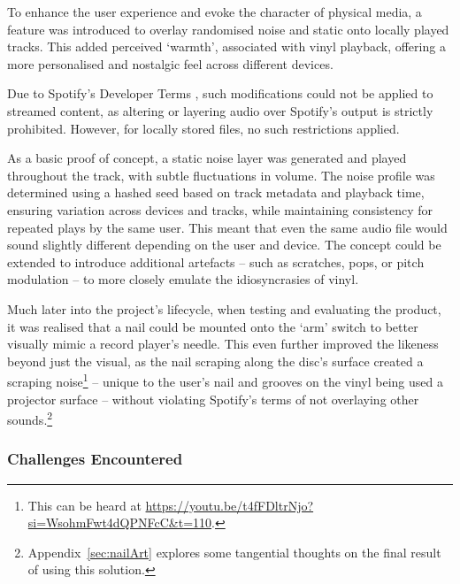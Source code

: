             To enhance the user experience and evoke the character of physical media, a feature was introduced to overlay randomised noise and static onto locally played tracks. This added perceived `warmth', associated with vinyl playback, offering a more personalised and nostalgic feel across different devices.
            
            Due to Spotify's Developer Terms \cite{spotifyDevTerms}, such modifications could not be applied to streamed content, as altering or layering audio over Spotify's output is strictly prohibited. However, for locally stored files, no such restrictions applied.
            
            As a basic proof of concept, a static noise layer was generated and played throughout the track, with subtle fluctuations in volume. The noise profile was determined using a hashed seed based on track metadata and playback time, ensuring variation across devices and tracks, while maintaining consistency for repeated plays by the same user. This meant that even the same audio file would sound slightly different depending on the user and device. The concept could be extended to introduce additional artefacts -- such as scratches, pops, or pitch modulation -- to more closely emulate the idiosyncrasies of vinyl.
    
            Much later into the project's lifecycle, when testing and evaluating the product, it was realised that a nail could be mounted onto the `arm' switch to better visually mimic a record player's needle. This even further improved the likeness beyond just the visual, as the nail scraping along the disc's surface created a scraping noise\footnote{This can be heard at \url{https://youtu.be/t4fFDltrNjo?si=WsohmFwt4dQPNFcC&t=110}.} -- unique to the user's nail and grooves on the vinyl being used a projector surface -- without violating Spotify's terms of not overlaying other sounds.\footnote{Appendix~\ref{sec:nailArt} explores some tangential thoughts on the final result of using this solution.}
        
            \subsubsection{Challenges Encountered}
    
